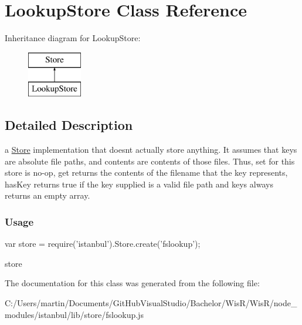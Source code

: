 \hypertarget{class_lookup_store}{}\section{Lookup\+Store Class Reference}
\label{class_lookup_store}
Inheritance diagram for Lookup\+Store\+:\begin{figure}[H]
\begin{center}
\leavevmode
\includegraphics[height=2.000000cm]{class_lookup_store}
\end{center}
\end{figure}


\subsection{Detailed Description}
a {\ttfamily \hyperlink{class_store}{Store}} implementation that doesn\textquotesingle{}t actually store anything. It assumes that keys are absolute file paths, and contents are contents of those files. Thus, {\ttfamily set} for this store is no-\/op, {\ttfamily get} returns the contents of the filename that the key represents, {\ttfamily has\+Key} returns true if the key supplied is a valid file path and {\ttfamily keys} always returns an empty array.

\subsubsection*{Usage }

\begin{DoxyVerb} var store = require('istanbul').Store.create('fslookup');
\end{DoxyVerb}


store  

The documentation for this class was generated from the following file\+:\begin{DoxyCompactItemize}
\item 
C\+:/\+Users/martin/\+Documents/\+Git\+Hub\+Visual\+Studio/\+Bachelor/\+Wis\+R/\+Wis\+R/node\+\_\+modules/istanbul/lib/store/fslookup.\+js\end{DoxyCompactItemize}
